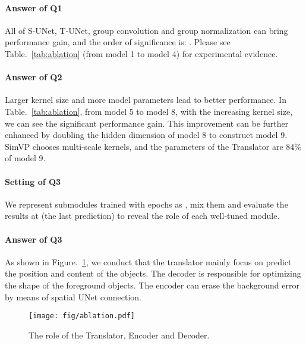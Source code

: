 \documentclass[10pt,twocolumn,letterpaper]{article}
\begin{document}
\vspace{-3mm}
\paragraph{Answer of Q1} All of S-UNet, T-UNet, group convolution and group normalization can bring performance gain, and the order of significance is: . Please see Table.~\ref{tab:ablation} (from model 1 to model 4) for experimental evidence.

\vspace{-3mm}
\paragraph{Answer of Q2} Larger kernel size and more model parameters lead to better performance. In Table.~\ref{tab:ablation}, from model 5 to model 8, with the increasing kernel size, we can see the significant performance gain. This improvement can be further enhanced by doubling the hidden dimension of model 8 to construct model 9. SimVP chooses multi-scale kernels, and the parameters of the Translator are 84\% of model 9. 



\vspace{-3mm}
\paragraph{Setting of Q3} We represent submodules trained with  epochs as , mix them and evaluate the results at  (the last prediction) to reveal the role of each well-tuned module.

\vspace{-3mm}
\paragraph{Answer of Q3} As shown in Figure.~\ref{fig:ablation}, we conduct that the translator mainly focus on predict the position and content of the objects. The decoder is responsible for optimizing the shape of the foreground objects. The encoder can erase the background error by means of spatial UNet connection.

\vspace{-2mm}
\begin{figure}[h]
  \centering
      \texttt{[image: fig/ablation.pdf]}

    \caption{ The role of the Translator, Encoder and Decoder. }
    \label{fig:ablation}
\end{figure}
\end{document}
